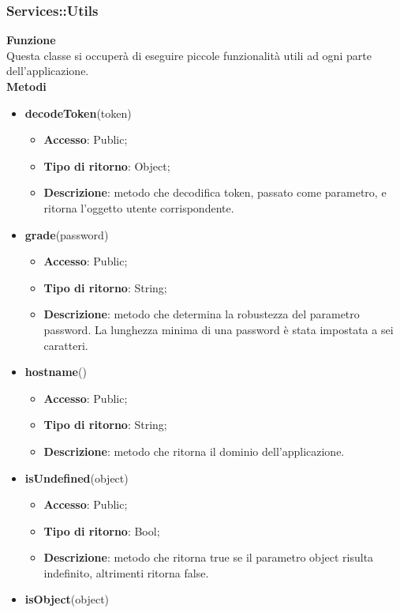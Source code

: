 {{		\subsubsection{Services::\-Utils}{
			\label{sub:servicesUtils}
			\textbf{Funzione}\\
			\indent Questa classe si occuperà di eseguire piccole funzionalità utili ad ogni parte dell'applicazione.\\
			\textbf{Metodi}
			\begin{itemize}
				\item \textbf{decodeToken}(token)
				\begin{itemize}
					\item \textbf{Accesso}: Public;
					\item \textbf{Tipo di ritorno}: Object;
					\item \textbf{Descrizione}: metodo che decodifica token, passato come parametro, e ritorna l'oggetto utente corrispondente.
				\end{itemize}
				\item \textbf{grade}(password)
				\begin{itemize}
					\item \textbf{Accesso}: Public;
					\item \textbf{Tipo di ritorno}: String;
					\item \textbf{Descrizione}: metodo che determina la robustezza del parametro password. La lunghezza minima di una password è stata impostata a sei caratteri.
				\end{itemize}
				\item \textbf{hostname}()
				\begin{itemize}
					\item \textbf{Accesso}: Public;
					\item \textbf{Tipo di ritorno}: String;
					\item \textbf{Descrizione}: metodo che ritorna il dominio dell'applicazione.
				\end{itemize}
				\item \textbf{isUndefined}(object)
				\begin{itemize}
					\item \textbf{Accesso}: Public;
					\item \textbf{Tipo di ritorno}: Bool;
					\item \textbf{Descrizione}: metodo che ritorna true se il parametro object risulta indefinito, altrimenti ritorna false.
				\end{itemize}
				\item \textbf{isObject}(object)

\end{itemize}}}}
